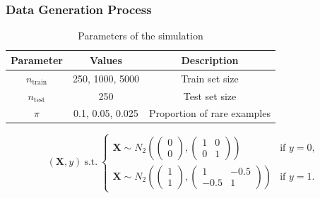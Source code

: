 \documentclass{beamer}
\begin{document}
\begin{frame}
  \frametitle{Data Generation Process}
  
  \small
  \begin{table}[h]
    \centering
    \begin{tabular}{|c|c|c|}
    \hline
    Parameter & Values & Description \\ 
    \hline
    $n_\text{train}$ & 250, 1000, 5000 & Train set size \\  
    $n_\text{test}$ & 250 & Test set size \\
    $\pi$ & 0.1, 0.05, 0.025 & Proportion of rare examples \\
    \hline
    \end{tabular}
    \caption{Parameters of the simulation}
    \label{table:parameters}
    \end{table}


    \small
    \begin{equation*}
      (\mathbf{X}, y) \ \text{s.t.} \
      \begin{cases} 
          \mathbf{X} \sim N_2\left(
            \begin{pmatrix}
            0 \\ 0
            \end{pmatrix},
            \begin{pmatrix}
            1 & 0 \\ 
            0 & 1
            \end{pmatrix}
            \right) & \text{if } y = 0, \\
          \mathbf{X} \sim N_2\left(
            \begin{pmatrix}
            1 \\ 1
            \end{pmatrix},
            \begin{pmatrix}
            1 & -0.5 \\ 
            -0.5 & 1
            \end{pmatrix}
            \right) & \text{if } y = 1.
      \end{cases}
  \end{equation*}
\end{frame}
\end{document}
